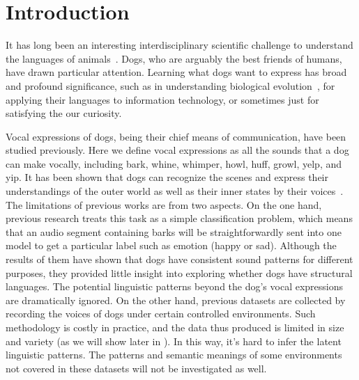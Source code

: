 \section{Introduction}
\label{sec:intro}

It has long been an interesting interdisciplinary scientific challenge to 
understand the languages of animals~\cite{hockett1959animal, radick2007simian,von1974yerkish}. Dogs, who are arguably the best friends
of humans, have drawn particular attention. Learning what dogs want to 
express has broad and profound significance, such as in understanding 
biological evolution~\cite{pongracz2017modeling}, for applying their languages 
to information technology, or sometimes just for satisfying the
our curiosity.

Vocal expressions of dogs, being their chief means of communication, have been studied previously. Here we define vocal expressions as all the sounds that a dog can make vocally, including bark, whine, whimper, howl, huff, growl, yelp, and yip.
It has been shown that dogs can recognize the scenes and express their understandings of the outer world as well as their inner states by their voices~\cite{molnar2008classification, hantke2018my}. 
The limitations of previous works are from two aspects. On the one hand, previous research treats this task as a simple 
classification problem, which means that an audio segment containing barks will be straightforwardly sent into one model to get a particular label such as emotion (happy or sad). Although the results of them have shown that dogs have consistent sound patterns for different purposes, they provided little insight into exploring whether dogs have structural languages. The potential linguistic patterns beyond the dog's vocal expressions are dramatically ignored. On the other hand, previous datasets are collected by recording the voices of dogs under certain controlled environments. Such methodology is costly in practice, and the data thus produced is limited in size and variety (as we will show later in ). In this way, it's hard to infer the latent linguistic patterns. The patterns and semantic meanings of some environments not covered in these datasets will not be investigated as well.


